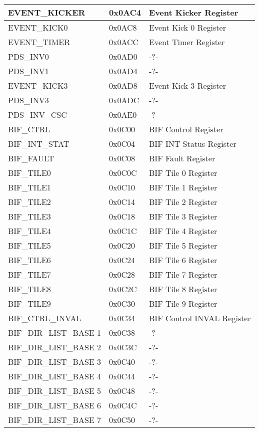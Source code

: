\begin{longtable}[c]{|m{}|C{0.10\textwidth}|m{0.42\textwidth}|}
	EVENT\_KICKER & 0x0AC4 & Event Kicker Register \\ \hline
	EVENT\_KICK0 & 0x0AC8 & Event Kick 0 Register \\ \hline
	EVENT\_TIMER & 0x0ACC & Event Timer Register \\ \hline
	PDS\_INV0 & 0x0AD0 & -?- \\ \hline
	PDS\_INV1 & 0x0AD4 & -?- \\ \hline
	EVENT\_KICK3 & 0x0AD8 & Event Kick 3 Register \\ \hline
	PDS\_INV3 & 0x0ADC & -?- \\ \hline
	PDS\_INV\_CSC & 0x0AE0 & -?- \\ \hline
	BIF\_CTRL & 0x0C00 & BIF Control Register \\ \hline
	BIF\_INT\_STAT  & 0x0C04 & BIF INT Status Register \\ \hline
	BIF\_FAULT  & 0x0C08 & BIF Fault Register \\ \hline
	BIF\_TILE0 & 0x0C0C & BIF Tile 0 Register \\ \hline
	BIF\_TILE1 & 0x0C10 & BIF Tile 1 Register \\ \hline
	BIF\_TILE2 & 0x0C14 & BIF Tile 2 Register \\ \hline
	BIF\_TILE3 & 0x0C18 & BIF Tile 3 Register \\ \hline
	BIF\_TILE4 & 0x0C1C & BIF Tile 4 Register \\ \hline
	BIF\_TILE5 & 0x0C20 & BIF Tile 5 Register \\ \hline
	BIF\_TILE6 & 0x0C24 & BIF Tile 6 Register \\ \hline
	BIF\_TILE7 & 0x0C28 & BIF Tile 7 Register \\ \hline
	BIF\_TILE8 & 0x0C2C & BIF Tile 8 Register \\ \hline
	BIF\_TILE9 & 0x0C30 & BIF Tile 9 Register \\ \hline
	BIF\_CTRL\_INVAL & 0x0C34 & BIF Control INVAL Register \\ \hline
	BIF\_DIR\_LIST\_BASE 1 & 0x0C38 & -?- \\ \hline
	BIF\_DIR\_LIST\_BASE 2 & 0x0C3C & -?- \\ \hline
	BIF\_DIR\_LIST\_BASE 3 & 0x0C40 & -?- \\ \hline
	BIF\_DIR\_LIST\_BASE 4 & 0x0C44 & -?- \\ \hline
	BIF\_DIR\_LIST\_BASE 5 & 0x0C48 & -?- \\ \hline
	BIF\_DIR\_LIST\_BASE 6 & 0x0C4C & -?- \\ \hline
	BIF\_DIR\_LIST\_BASE 7 & 0x0C50 & -?- \\ \hline

\end{longtable}
